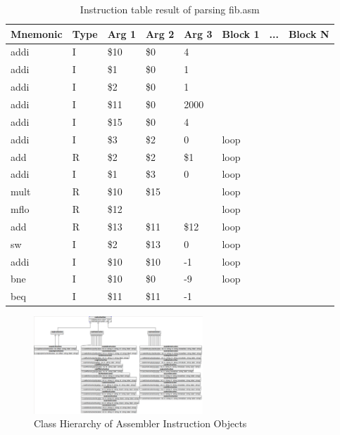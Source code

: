 \documentclass[conference]{IEEEtran}
\begin{document}
\begin{table}[h]
\caption{Instruction table result of parsing fib.asm}
\label{instructTable}
\begin{tabular}{@{}llllllll@{}}
\toprule
Mnemonic & Type & Arg 1 & Arg 2 & Arg 3 & Block 1 & ... & Block N \\ \midrule
addi     & I    & \$10  & \$0   & 4     &         &     &         \\
addi     & I    & \$1   & \$0   & 1     &         &     &         \\
addi     & I    & \$2   & \$0   & 1     &         &     &         \\
addi     & I    & \$11  & \$0   & 2000  &         &     &         \\
addi     & I    & \$15  & \$0   & 4     &         &     &         \\
addi     & I    & \$3   & \$2   & 0     & loop    &     &         \\
add      & R    & \$2   & \$2   & \$1   & loop    &     &         \\
addi     & I    & \$1   & \$3   & 0     & loop    &     &         \\
mult     & R    & \$10  & \$15  &       & loop    &     &         \\
mflo     & R    & \$12  &       &       & loop    &     &         \\
add      & R    & \$13  & \$11  & \$12  & loop    &     &         \\
sw       & I    & \$2   & \$13  & 0     & loop    &     &         \\
addi     & I    & \$10  & \$10  & -1    & loop    &     &         \\
bne      & I    & \$10  & \$0   & -9    & loop    &     &         \\
beq      & I    & \$11  & \$11  & -1    &         &     &         \\ \bottomrule
\end{tabular}
\end{table}

\begin{figure}[!h]
\centering
\includegraphics[width=2.5in]{Figures/coaAssemblerUML}
\caption{Class Hierarchy of Assembler Instruction Objects}
\label{classDiagram}
\end{figure}
\end{document}
